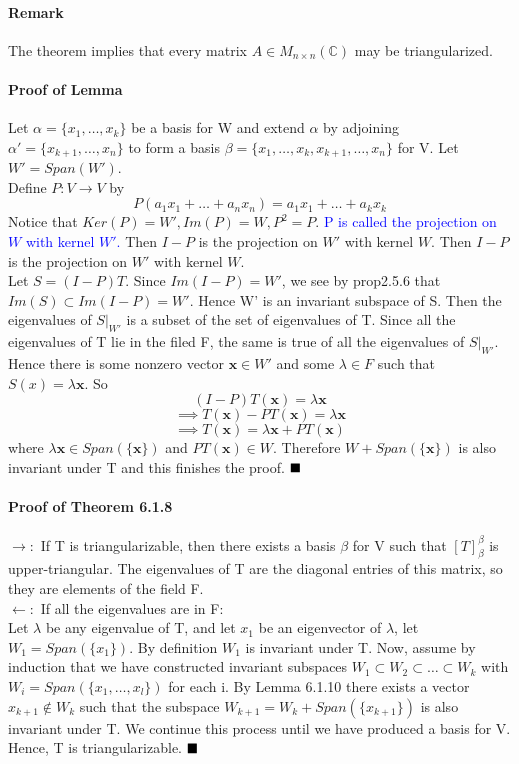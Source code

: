 \documentclass[11pt]{article}
\newcommand{\tb}[1]{\textbf{#1}}
\newcommand{\qed}[0]{$\hfill\blacksquare$}
\newcommand{\mc}[0]{\mathbb{C}}
\newcommand{\vx}[0]{\tb{x}}
\begin{document}
{\paragraph{Remark} The theorem implies that every matrix $A \in M_{n\times n}(\mc)$ may be triangularized.
\paragraph{Proof of Lemma}
Let $\alpha = \{x_1,\hdots,x_k\}$ be a basis for W and extend $\alpha$ by adjoining $\alpha' = \{x_{k+1},\hdots, x_n\}$ to form a basis $\beta = \{x_1,\hdots, x_k, x_{k+1},\hdots, x_n\}$ for V. Let $W' = Span(W')$.\\
Define $P:V\rightarrow V$ by $$P(a_1x_1+\hdots+a_nx_n) = a_1x_1+\hdots+a_kx_k$$
Notice that $Ker(P) = W', Im(P)=W, P^2 = P$. \textcolor{blue}{P is called the projection on $W$ with kernel $W'$.} Then $I - P$ is the projection on $W'$ with kernel $W$.
Then $I-P$ is the projection on $W'$ with kernel $W$.\\
Let $S = (I-P)T$. Since $Im(I-P) = W'$, we see by prop2.5.6 that $Im(S) \subset Im(I-P) = W'$. Hence W' is an invariant subspace of S.
Then the eigenvalues of $S|_{W'}$ is a subset of the set of eigenvalues of T. Since all the eigenvalues of T lie in the filed F, the same is true of all the eigenvalues of $S|_{W'}$. Hence there is some nonzero vector $\vx \in W'$ and some $\lambda \in F$ such that $S(x) = \lambda\vx$. So
$$(I-P)T(\vx) = \lambda\vx$$
$$\implies T(\vx) - PT(\vx) = \lambda \vx$$
$$\implies T(\vx) = \lambda\vx + PT(\vx)$$
where $\lambda\vx \in Span(\{\vx\})$ and $PT(\vx) \in W$. Therefore $W + Span(\{\vx\})$ is also invariant under T and this finishes the proof. \qed
\paragraph{Proof of Theorem 6.1.8}
$\rightarrow:$ If T is triangularizable, then there exists a basis $\beta$ for V such that $[T]_\beta^\beta$ is upper-triangular. The eigenvalues of T are the diagonal entries of this matrix, so they are elements of the field F.\\
$\leftarrow:$ If all the eigenvalues are in F:\\
Let $\lambda$ be any eigenvalue of T, and let $x_1$ be an eigenvector of $\lambda$, let $W_1 = Span(\{x_1\})$. By definition $W_1$ is invariant under T. Now, assume by induction that we have constructed invariant subspaces $W_1 \subset W_2 \subset \hdots \subset W_k$ with $W_i = Span(\{x_1,\hdots,x_l\})$ for each i. By Lemma 6.1.10 there exists a vector $x_{k+1} \notin W_k$ such that the subspace $W_{k+1} = W_k + Span(\{x_{k+1}\})$ is also invariant under T. We continue this process until we have produced a basis for V. Hence, T is triangularizable. \qed

}
\end{document}
